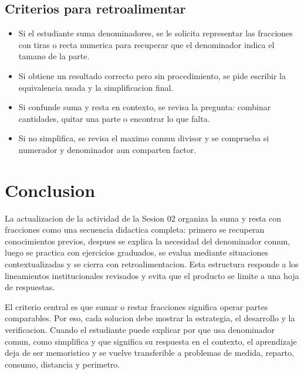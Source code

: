 \documentclass[
	spanish,
	letterpaper, oneside
]{article}
\begin{document}
\subsection{Criterios para retroalimentar}

\begin{itemize}
	\item Si el estudiante suma denominadores, se le solicita representar las fracciones con tiras o recta numerica para recuperar que el denominador indica el tamano de la parte.
	\item Si obtiene un resultado correcto pero sin procedimiento, se pide escribir la equivalencia usada y la simplificacion final.
	\item Si confunde suma y resta en contexto, se revisa la pregunta: combinar cantidades, quitar una parte o encontrar lo que falta.
	\item Si no simplifica, se revisa el maximo comun divisor y se comprueba si numerador y denominador aun comparten factor.
\end{itemize}

\section{Conclusion}

La actualizacion de la actividad de la Sesion 02 organiza la suma y resta con fracciones como una secuencia didactica completa: primero se recuperan conocimientos previos, despues se explica la necesidad del denominador comun, luego se practica con ejercicios graduados, se evalua mediante situaciones contextualizadas y se cierra con retroalimentacion. Esta estructura responde a los lineamientos institucionales revisados y evita que el producto se limite a una hoja de respuestas.

El criterio central es que sumar o restar fracciones significa operar partes comparables. Por eso, cada solucion debe mostrar la estrategia, el desarrollo y la verificacion. Cuando el estudiante puede explicar por que usa denominador comun, como simplifica y que significa su respuesta en el contexto, el aprendizaje deja de ser memoristico y se vuelve transferible a problemas de medida, reparto, consumo, distancia y perimetro.

\end{document}
